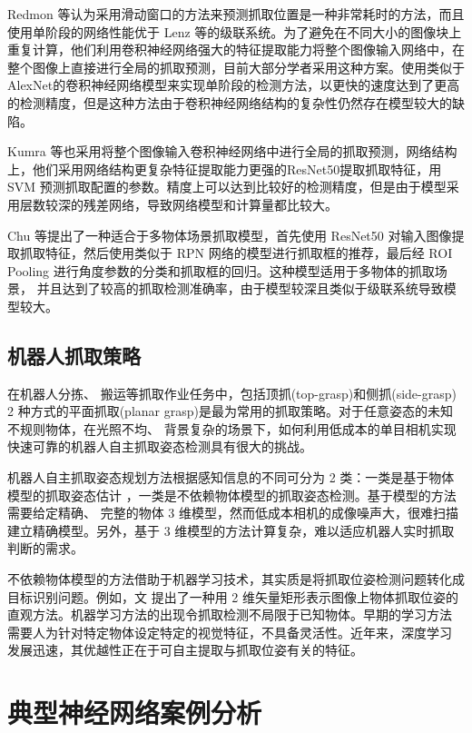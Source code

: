 \documentclass[no-math, withoutpreface]{YangThesis}
\begin{document}
Redmon 等\cite{bib7}认为采用滑动窗口的方法来预测抓取位置是一种非常耗时的方法，而且使用单阶段的网络性能优于 Lenz 等的级联系统。为了避免在不同大小的图像块上重复计算，他们利用卷积神经网络强大的特征提取能力将整个图像输入网络中，在整个图像上直接进行全局的抓取预测，目前大部分学者采用这种方案\cite{bib5,bib8}。使用类似于 AlexNet\cite{bib9}的卷积神经网络模型来实现单阶段的检测方法，以更快的速度达到了更高的检测精度，但是这种方法由于卷积神经网络结构的复杂性仍然存在模型较大的缺陷。 

Kumra 等\cite{bib4}也采用将整个图像输入卷积神经网络中进行全局的抓取预测，网络结构上，他们采用网络结构更复杂特征提取能力更强的ResNet50提取抓取特征\cite{bib10}，用 SVM 预测抓取配置的参数。精度上可以达到比较好的检测精度，但是由于模型采用层数较深的残差网络，导致网络模型和计算量都比较大。

Chu 等\cite{bib5}提出了一种适合于多物体场景抓取模型，首先使用 ResNet50 对输入图像提取抓取特征，然后使用类似于 RPN  网络的模型进行抓取框的推荐，最后经 ROI  Pooling 进行角度参数的分类和抓取框的回归。这种模型适用于多物体的抓取场景， 并且达到了较高的抓取检测准确率，由于模型较深且类似于级联系统导致模型较大。

\subsection{机器人抓取策略}
在机器人分拣、 搬运等抓取作业任务中，包括顶抓(top-grasp)和侧抓(side-grasp) 2 种方式的平面抓取(planar grasp)是最为常用的抓取策略。对于任意姿态的未知不规则物体，在光照不均、 背景复杂的场景下，如何利用低成本的单目相机实现快速可靠的机器人自主抓取姿态检测具有很大的挑战。

机器人自主抓取姿态规划方法根据感知信息的不同可分为 2 类：一类是基于物体模型的抓取姿态估计 \cite{bibb1,bibb2,bibb3}，一类是不依赖物体模型的抓取姿态检测。基于模型的方法需要给定精确、 完整的物体 3 维模型，然而低成本相机的成像噪声大，很难扫描建立精确模型。另外，基于 3 维模型的方法计算复杂，难以适应机器人实时抓取判断的需求。

不依赖物体模型的方法借助于机器学习技术，其实质是将抓取位姿检测问题转化成目标识别问题。例如，文 \cite{bibb4} 提出了一种用 2 维矢量矩形表示图像上物体抓取位姿的直观方法。机器学习方法的出现令抓取检测不局限于已知物体。早期的学习方法 \cite{bibb4} 需要人为针对特定物体设定特定的视觉特征，不具备灵活性。近年来，深度学习 \cite{bibb5} 发展迅速，其优越性正在于可自主提取与抓取位姿有关的特征。 

\newpage
\section{典型神经网络案例分析}
\end{document}
